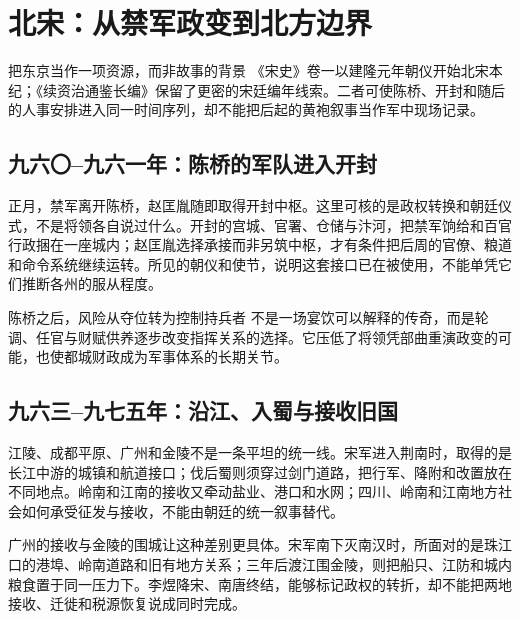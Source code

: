 \section{北宋：从禁军政变到北方边界}

\begin{textwindow}{把东京当作一项资源，而非故事的背景}
《宋史》卷一以建隆元年朝仪开始北宋本纪；《续资治通鉴长编》保留了更密的宋廷编年线索。二者可使陈桥、开封和随后的人事安排进入同一时间序列，却不能把后起的黄袍叙事当作军中现场记录。
\end{textwindow}

\subsection{九六〇--九六一年：陈桥的军队进入开封}
正月，禁军离开陈桥，赵匡胤随即取得开封中枢。这里可核的是政权转换和朝廷仪式，不是将领各自说过什么。开封的宫城、官署、仓储与汴河，把禁军饷给和百官行政捆在一座城内；赵匡胤选择承接而非另筑中枢，才有条件把后周的官僚、粮道和命令系统继续运转。所见的朝仪和使节，说明这套接口已在被使用，不能单凭它们推断各州的服从程度。

\begin{turningpoint}{陈桥之后，风险从夺位转为控制持兵者}
不是一场宴饮可以解释的传奇，而是轮调、任官与财赋供养逐步改变指挥关系的选择。它压低了将领凭部曲重演政变的可能，也使都城财政成为军事体系的长期关节。
\end{turningpoint}

\subsection{九六三--九七五年：沿江、入蜀与接收旧国}
江陵、成都平原、广州和金陵不是一条平坦的统一线。宋军进入荆南时，取得的是长江中游的城镇和航道接口；伐后蜀则须穿过剑门道路，把行军、降附和改置放在不同地点。岭南和江南的接收又牵动盐业、港口和水网；四川、岭南和江南地方社会如何承受征发与接收，不能由朝廷的统一叙事替代。

广州的接收与金陵的围城让这种差别更具体。宋军南下灭南汉时，所面对的是珠江口的港埠、岭南道路和旧有地方关系；三年后渡江围金陵，则把船只、江防和城内粮食置于同一压力下。李煜降宋、南唐终结，能够标记政权的转折，却不能把两地接收、迁徙和税源恢复说成同时完成。


